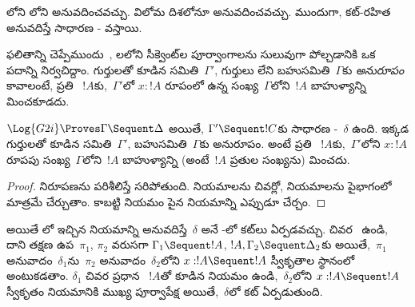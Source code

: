 \documentclass[../../../include/open-logic-section]{subfiles}
\begin{document}


లోని  లోని  అనువదించవచ్చు. విలోమ దిశలోనూ అనువదించవచ్చు. ముందుగా, కట్-రహిత   అనువదిస్తే సాధారణ - వస్తాయి.

ఫలితాన్ని చెప్పేముందు~, లలోని సీక్వెంట్‌ల పూర్వాంగాలను సులువుగా పోల్చడానికి ఒక పదాన్ని నిర్వచిద్దాం. గుర్తులతో కూడిన  సమితి~$\Gamma'$, గుర్తులు లేని  బహుసమితి~$\Gamma$కు \emph{అనురూపం} కావాలంటే, ప్రతి ~$!A$కు,~$\Gamma'$లో $x : !A$ రూపంలో ఉన్న  సంఖ్య~$\Gamma$లోని~$!A$ బాహుళ్యాన్ని మించకూడదు.

\begin{cor}
$\Log{G2i} \Proves \Gamma \Sequent \Delta$ అయితే, $\Gamma' \Sequent !C$కు సాధారణ -~$\delta$ ఉంది. ఇక్కడ గుర్తులతో కూడిన  సమితి~$\Gamma'$, బహుసమితి~$\Gamma$కు అనురూపం. అంటే ప్రతి ~$!A$కు,~$\Gamma'$లోని $x : !A$ రూపపు  సంఖ్య~$\Gamma$లోని~$!A$ బాహుళ్యాన్ని (అంటే~$!A$ ప్రతుల సంఖ్యను) మించదు.
\end{cor}

\begin{proof}
 నిరూపణను పరిశీలిస్తే సరిపోతుంది.  నియమాలను  చివర్లో,  నియమాలను  పైభాగంలో మాత్రమే చేర్చుతాం. కాబట్టి  నియమం పైన  నియమాన్ని ఎప్పుడూ చేర్చం.
\end{proof}

అయితే లో ఇచ్చిన \Cut{} నియమాన్ని అనువదిస్తే~$\delta$ అనే -లో కట్‌లు ఏర్పడవచ్చు.   చివర~\Cut{} ఉండి, దాని తక్షణ ఉప~$\pi_1$, $\pi_2$ వరుసగా $\Gamma_1
\Sequent !A$, $!A, \Gamma_2 \Sequent \Delta_2$కు అయితే,~$\pi_1$ అనువాదం~$\delta_1$ను~$\pi_2$ అనువాదం~$\delta_2$లోని $x:!A
\Sequent !A$ స్వీకృతాల స్థానంలో అంటుకడతాం. $\delta_1$ చివర ప్రధాన ~$!A$తో కూడిన  నియమం ఉండి,~$\delta_2$లోని $x:!A \Sequent !A$ స్వీకృతం  నియమానికి ముఖ్య పూర్వాపేక్ష అయితే,~$\delta$లో కట్ ఏర్పడుతుంది.
\end{document}
